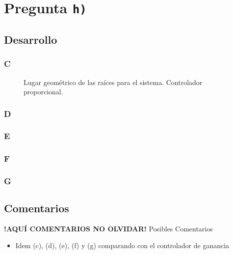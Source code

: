 \section{Pregunta \texttt{h)}}\label{pregunta-h}
\subsection{Desarrollo}

\subsubsection{C} %

\begin{figure}[ht]
  \centering
  
  \caption{Lugar geométrico de las raíces para el sistema. Controlador proporcional.}
  \label{fig:lgr-h}
\end{figure}

\FloatBarrier
\subsubsection{D}%

\FloatBarrier
\subsubsection{E}%

\FloatBarrier
\subsubsection{F}%

\FloatBarrier
\subsubsection{G}%

\FloatBarrier
\subsection{Comentarios}


\textbf{!AQUÍ COMENTARIOS NO OLVIDAR!}
Posibles Comentarios
\begin{itemize}
    \item Idem (c), (d), (e), (f) y (g) comparando con el controlador de ganancia
\end{itemize}
